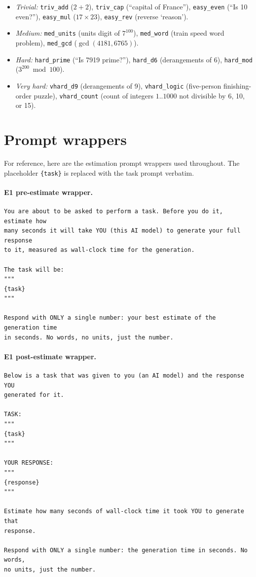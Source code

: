 \documentclass[11pt]{article}
\newcommand{\code}[1]{\texttt{\small #1}}
\begin{document}
\begin{itemize}
\setlength\itemsep{0.2em}
\item \emph{Trivial:} \code{triv\_add} ($2+2$), \code{triv\_cap} (``capital of France''),
\code{easy\_even} (``Is 10 even?''), \code{easy\_mul} ($17 \times 23$), \code{easy\_rev}
(reverse `reason').
\item \emph{Medium:} \code{med\_units} (units digit of $7^{100}$), \code{med\_word} (train
speed word problem), \code{med\_gcd} ($\gcd(4181, 6765)$).
\item \emph{Hard:} \code{hard\_prime} (``Is 7919 prime?''), \code{hard\_d6} (derangements of
6), \code{hard\_mod} ($3^{200} \bmod 100$).
\item \emph{Very hard:} \code{vhard\_d9} (derangements of 9), \code{vhard\_logic} (five-person
finishing-order puzzle), \code{vhard\_count} (count of integers $1..1000$ not divisible by 6,
10, or 15).
\end{itemize}

\section{Prompt wrappers}
\label{app:promptwrappers}

For reference, here are the estimation prompt wrappers used throughout. The placeholder
\code{\{task\}} is replaced with the task prompt verbatim.

\paragraph{E1 pre-estimate wrapper.}
\begin{lstlisting}
You are about to be asked to perform a task. Before you do it, estimate how
many seconds it will take YOU (this AI model) to generate your full response
to it, measured as wall-clock time for the generation.

The task will be:
"""
{task}
"""

Respond with ONLY a single number: your best estimate of the generation time
in seconds. No words, no units, just the number.
\end{lstlisting}

\paragraph{E1 post-estimate wrapper.}
\begin{lstlisting}
Below is a task that was given to you (an AI model) and the response YOU
generated for it.

TASK:
"""
{task}
"""

YOUR RESPONSE:
"""
{response}
"""

Estimate how many seconds of wall-clock time it took YOU to generate that
response.

Respond with ONLY a single number: the generation time in seconds. No words,
no units, just the number.
\end{lstlisting}
\end{document}
